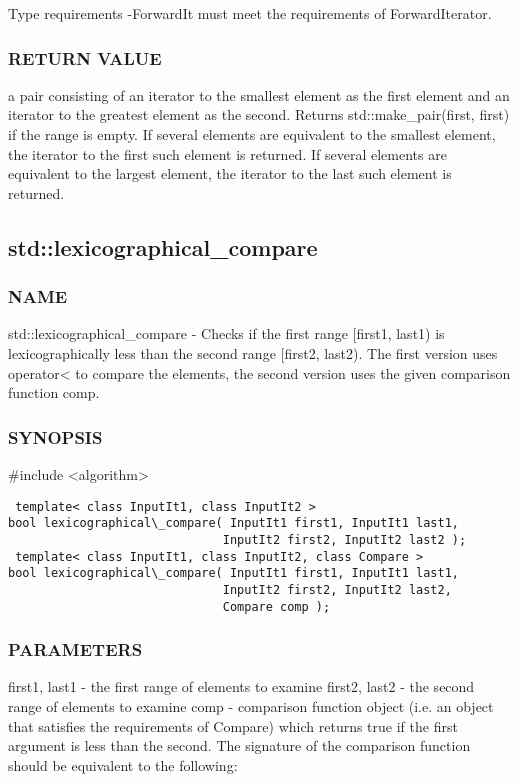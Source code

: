  Type requirements
 -ForwardIt must meet the requirements of ForwardIterator.

\subsubsection{RETURN VALUE}
a pair consisting of an iterator to the smallest element as the first element and an iterator to the greatest element as the second. Returns std::make\_pair(first, first) if the range is empty. If several elements are equivalent to the smallest element, the iterator to the first such element is returned. If several elements are equivalent to the largest element, the iterator to the last such element is returned.



\subsection{std::lexicographical\_compare}

\subsubsection{NAME}
std::lexicographical\_compare - Checks if the first range [first1, last1) is lexicographically less than the second range [first2, last2). The first version uses operator< to compare the elements, the second version uses the given comparison function comp.

\subsubsection{SYNOPSIS}
\#include <algorithm>

\begin{lstlisting}
 template< class InputIt1, class InputIt2 >
bool lexicographical\_compare( InputIt1 first1, InputIt1 last1,
                              InputIt2 first2, InputIt2 last2 );
 template< class InputIt1, class InputIt2, class Compare >
bool lexicographical\_compare( InputIt1 first1, InputIt1 last1,
                              InputIt2 first2, InputIt2 last2,
                              Compare comp );
\end{lstlisting}

\subsubsection{PARAMETERS}
first1, last1 - the first range of elements to examine
first2, last2 - the second range of elements to examine
comp - comparison function object (i.e. an object that satisfies the requirements of Compare) which returns true if the first argument is less than the second.
The signature of the comparison function should be equivalent to the following:

